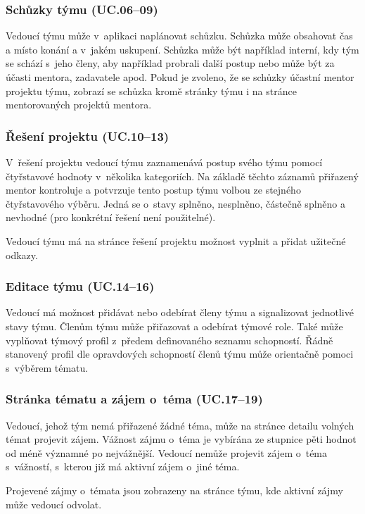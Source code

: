 \documentclass[czech,BP]{thesiskiv}
\begin{document}
			\subsubsection{Schůzky týmu (UC.06--09)}
				\par Vedoucí týmu může v~aplikaci naplánovat schůzku. Schůzka může obsahovat čas a místo konání a v~jakém uskupení. Schůzka může být například interní, kdy tým se schází s~jeho členy, aby například probrali další postup nebo může být za účasti mentora, zadavatele apod. Pokud je zvoleno, že se schůzky účastní mentor projektu týmu, zobrazí se schůzka kromě stránky týmu i na stránce mentorovaných projektů mentora.
			\subsubsection{Řešení projektu (UC.10--13)}
				\par V~řešení projektu vedoucí týmu zaznamenává postup svého týmu pomocí čtyřstavové hodnoty v~několika kategoriích. Na základě těchto záznamů přiřazený mentor kontroluje a potvrzuje tento postup týmu volbou ze stejného čtyřstavového výběru. Jedná se o~stavy splněno, nesplněno, částečně splněno a nevhodné (pro konkrétní řešení není použitelné).
				\par Vedoucí týmu má na stránce řešení projektu možnost vyplnit a přidat užitečné odkazy.
			\subsubsection{Editace týmu (UC.14--16)}
				\par Vedoucí má možnost přidávat nebo odebírat členy týmu a signalizovat jednotlivé stavy týmu. Členům týmu může přiřazovat a odebírat týmové role. Také může vyplňovat týmový profil z~předem definovaného seznamu schopností. Řádně stanovený profil dle opravdových schopností členů týmu může orientačně pomoci s~výběrem tématu.
			\subsubsection{Stránka tématu a zájem o~téma (UC.17--19)}
				\par Vedoucí, jehož tým nemá přiřazené žádné téma, může na stránce detailu volných témat projevit zájem. Vážnost zájmu o~téma je vybírána ze stupnice pěti hodnot od méně významné po nejvážnější. Vedoucí nemůže projevit zájem o~téma s~vážností, s~kterou již má aktivní zájem o~jiné téma.
				\par Projevené zájmy o~témata jsou zobrazeny na stránce týmu, kde aktivní zájmy může vedoucí odvolat.
\end{document}
